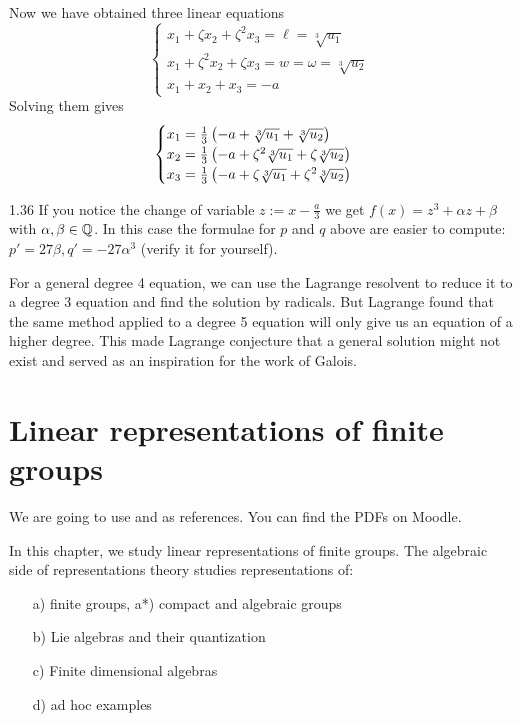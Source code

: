 \documentclass[twoside = false,	%
		headsepline,		%
		parskip = true,
		]{scrbook}						%
\begin{document}
            Now we have obtained three linear equations
            $$
            \begin{cases}
            x_1+\zeta x_2+\zeta^2x_3=\ell=\sqrt[3]{u_1}\\
            x_1+\zeta^2x_2+\zeta x_3=w=\omega=\sqrt[3]{u_2}\\
            x_1+x_2+x_3=-a
            \end{cases}
            $$
            Solving them gives 
            $$
            \begin{cases}
            x_1=\frac13\left( -a+\sqrt[3]{u_1}+\sqrt[3]{u_2}\right)\\
            x_2=\frac13\left( -a+\zeta^2\sqrt[3]{u_1}+\zeta\sqrt[3]{u_2}\right)\\
            x_3=\frac13\left( -a+\zeta\sqrt[3]{u_1}+\zeta^2\sqrt[3]{u_2}\right)
            \end{cases}
            $$
            \begin{remark}{}{1.36}
                If you notice the change of variable $z:=x-\frac a3$ we get $f(x)=z^3+\alpha z+\beta$ with $\alpha,\beta \in\mathbb Q$. In this case the formulae for $p$ and $q$ above are easier to compute: $p'=27\beta, q'=-27\alpha^3$ (verify it for yourself).
            \end{remark}
            For a general degree 4 equation, we can use the Lagrange resolvent to reduce it to a degree 3 equation and find the solution by radicals. But Lagrange found that the same method applied to a degree 5 equation will only give us an equation of a higher degree. This made Lagrange conjecture that a general solution might not exist and served as an inspiration for the work of Galois.
            
            
\chapter{Linear representations of finite groups}
    We are going to use \cite{Serre.1977} and \cite{FultonHarris.1991} as references. You can find the PDFs on Moodle.
    
    In this chapter, we study linear representations of finite groups. The algebraic side of representations theory studies representations of:
    
    \begin{enumerate}
        \item[a)] finite groups, a*) compact and algebraic groups
        \item[b)] Lie algebras and their quantization
        \item[c)] Finite dimensional algebras
        \item[d)] ad hoc examples
    \end{enumerate}
    
\end{document}
